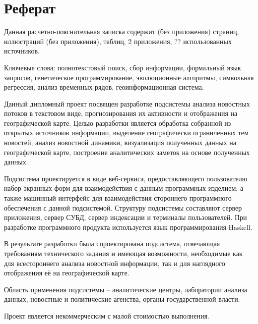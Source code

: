 \section*{Реферат}

Данная расчетно-пояснительная записка содержит \pageref{LastPage} (без приложения) страниц,  иллюстраций (без приложения),  таблиц, 2 приложения, ?? использованных источников.

Ключевые слова: полнотекстовый поиск, сбор информации, формальный язык запросов, генетическое программирование, эволюционные алгоритмы, символьная регрессия, анализ временных рядов, геоинформационная система.

Данный дипломный проект посвящен разработке подсистемы анализа новостных потоков в текстовом виде, прогнозирования их активности и отображения на географической карте. Целью разработки является обработка собранной из открытых источников информации, выделение географически ограниченных тем новостей, анализ новостной динамики, визуализация полученных данных на географической карте, построение аналитических заметок на основе полученных данных.

Подсистема проектируется в виде веб-сервиса, предоставляющего пользователю набор экранных форм для взаимодействия с данным программных изделием, а также машинный интерфейс для взаимодействия стороннего программного обеспечения с данной подсистемой. Структуру подсистемы составляют сервер приложения, сервер СУБД, сервер индексации и терминалы пользователей. При разработке программного продукта используется язык программирования Haskell.

В результате разработки была спроектирована подсистема, отвечающая требованиям технического задания и имеющая возможности, необходимые как для всестороннего анализа новостной информации, так и для наглядного отображения её на географической карте. 

Область применения подсистемы -- аналитические центры, лаборатории анализа данных, новостные и политические агенства, органы государственной власти.

Проект является некоммерческим с малой стоимостью выполнения.